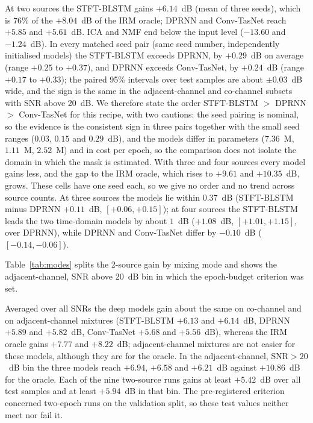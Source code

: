 \documentclass[journal]{IEEEtran}
\begin{document}
At two sources the STFT-BLSTM gains $+6.14$~dB (mean of three seeds), which is 76\% of the
$+8.04$~dB of the IRM oracle; DPRNN and Conv-TasNet reach $+5.85$ and $+5.61$~dB. ICA and NMF end below the
input level ($-13.60$ and $-1.24$~dB). In every matched seed pair (same seed number, independently
initialised models) the STFT-BLSTM exceeds DPRNN, by $+0.29$~dB on average (range $+0.25$ to $+0.37$), and DPRNN exceeds Conv-TasNet, by $+0.24$~dB
(range $+0.17$ to $+0.33$); the paired 95\% intervals over test samples are about $\pm0.03$~dB wide, and the sign is the same in the
adjacent-channel and co-channel subsets with SNR above 20~dB. We therefore state the order STFT-BLSTM $>$ DPRNN $>$ Conv-TasNet for this recipe, with two cautions: the
seed pairing is nominal, so the evidence is the consistent sign in three pairs together with the small seed ranges ($0.03$, $0.15$ and $0.29$~dB), and the models differ in
parameters ($7.36$~M, $1.11$~M, $2.52$~M) and in cost per epoch, so the comparison does not isolate the domain in which the mask is estimated.
With three and four sources every model gains less, and the gap to the IRM oracle, which rises to $+9.61$ and $+10.35$~dB, grows. These cells have one seed each, so we
give no order and no trend across source counts. At three sources the models lie within $0.37$~dB (STFT-BLSTM minus DPRNN $+0.11$~dB, $[+0.06,+0.15]$);
at four sources the STFT-BLSTM leads the two time-domain models by about $1$~dB ($+1.08$~dB, $[+1.01,+1.15]$, over DPRNN), while DPRNN and Conv-TasNet differ by $-0.10$~dB ($[-0.14,-0.06]$).

Table~\ref{tab:modes} splits the 2-source gain by mixing mode and shows the
adjacent-channel, SNR above 20~dB bin in which the epoch-budget criterion was set.

\begin{table}[t]
\centering
\caption{Two-source gain over the input (dB) by mixing mode on the test split.
$N$ is the number of test samples in each column.}
\label{tab:modes}
\resizebox{\columnwidth}{!}{%
}
\end{table}

Averaged over all SNRs the deep models gain about the same on co-channel and on adjacent-channel mixtures
(STFT-BLSTM $+6.13$ and $+6.14$~dB, DPRNN $+5.89$ and $+5.82$~dB, Conv-TasNet $+5.68$ and $+5.56$~dB), whereas the IRM oracle gains $+7.77$ and
$+8.22$~dB; adjacent-channel mixtures are not easier for these models, although they are for the oracle. In the adjacent-channel, SNR${>}20$~dB bin the
three models reach $+6.94$, $+6.58$ and $+6.21$~dB against $+10.86$~dB for the oracle. Each of the nine two-source runs gains at least $+5.42$~dB over all test samples and at least
$+5.94$~dB in that bin. The pre-registered criterion concerned two-epoch runs on the validation split, so these test values neither meet nor fail it.
\end{document}
